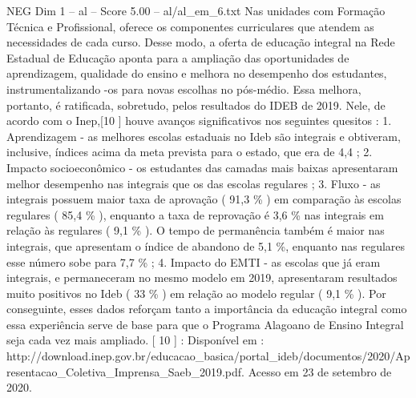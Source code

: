 \begin{textsample}{NEG Dim 1 – al – Score 5.00 – al/al\_em\_6.txt}
Nas unidades com Formação Técnica e Profissional, oferece os componentes curriculares que atendem as necessidades de cada curso.
Desse modo, a oferta de educação integral na Rede Estadual de Educação aponta para a ampliação das oportunidades de aprendizagem, qualidade do ensino e melhora no desempenho dos estudantes, instrumentalizando -os para novas escolhas no pós-médio.
Essa melhora, portanto, é ratificada, sobretudo, pelos resultados do IDEB de 2019.
Nele, de acordo com o Inep,[10 ] houve avanços significativos nos seguintes quesitos : 1.
Aprendizagem - as melhores escolas estaduais no Ideb são integrais e obtiveram, inclusive, índices acima da meta prevista para o estado, que era de 4,4 ; 2.
Impacto socioeconômico - os estudantes das camadas mais baixas apresentaram melhor desempenho nas integrais que os das escolas regulares ; 3.
Fluxo - as integrais possuem maior taxa de aprovação ( 91,3 \% ) em comparação às escolas regulares ( 85,4 \% ), enquanto a taxa de reprovação é 3,6 \% nas integrais em relação às regulares ( 9,1 \% ).
O tempo de permanência também é maior nas integrais, que apresentam o índice de abandono de 5,1 \%, enquanto nas regulares esse número sobe para 7,7 \% ; 4.
Impacto do EMTI - as escolas que já eram integrais, e permaneceram no mesmo modelo em 2019, apresentaram resultados muito positivos no Ideb ( 33 \% ) em relação ao modelo regular ( 9,1 \% ).
Por conseguinte, esses dados reforçam tanto a importância da educação integral como essa experiência serve de base para que o Programa Alagoano de Ensino Integral seja cada vez mais ampliado. [ 10 ] : Disponível em : http://download.inep.gov.br/educacao\_basica/portal\_ideb/documentos/2020/Apresentacao\_Coletiva\_Imprensa\_Saeb\_2019.pdf.
Acesso em 23 de setembro de 2020.

\end{textsample}
